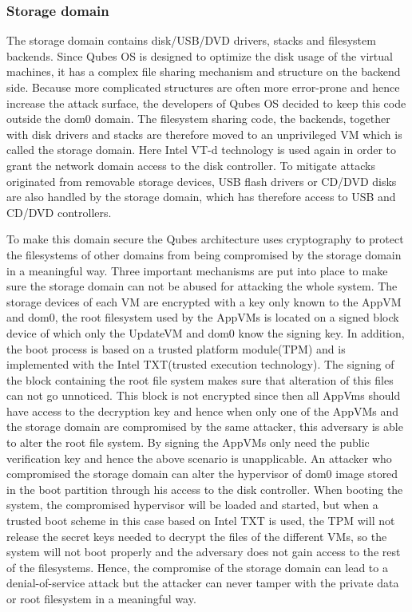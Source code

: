 \documentclass[runningheads,a4paper]{article}
\begin{document}
\subsubsection{Storage domain}

The storage domain contains disk/USB/DVD drivers, stacks and
filesystem backends. Since Qubes OS is designed to optimize the disk
usage of the virtual machines, it has a complex file sharing mechanism
and structure on the backend side. Because more complicated structures
are often more error-prone and hence increase the attack surface, the
developers of Qubes OS decided to keep this code outside the dom0
domain. The filesystem sharing code, the backends, together with disk
drivers and stacks are therefore moved to an unprivileged VM which is
called the storage domain. Here Intel VT-d technology is used again in 
order to grant the network domain access to the disk controller. To
mitigate attacks originated from removable storage devices, USB flash
drivers or CD/DVD disks are also handled by the storage domain, which
has therefore access to USB and CD/DVD controllers.

To make this domain secure the Qubes architecture uses cryptography to
protect the filesystems of other domains from being compromised by the
storage domain in a meaningful way. Three important mechanisms are put
into place to make sure the storage domain can not be abused for
attacking the whole system. The storage devices of each VM are
encrypted with a key only known to the AppVM and dom0, the root
filesystem used by the AppVMs is located on a signed block device of
which only the UpdateVM and dom0 know the signing key. In addition, the boot
process is based on a trusted platform module(TPM) and is implemented
with the Intel TXT(trusted execution technology). The signing of the
block containing the root file system makes sure that alteration of
this files can not go unnoticed. This block is not encrypted since
then all AppVms should have access to the decryption key and hence
when only one of the AppVMs and the storage domain are compromised by
the same attacker, this adversary is able to alter the root file
system. By signing the AppVMs only need the public verification key
and hence the above scenario is unapplicable. An attacker who
compromised the storage domain can alter the hypervisor of dom0 image
stored in the boot partition through his access to the disk
controller. When booting the system, the compromised hypervisor will be
loaded and started, but when a trusted boot scheme in this case based
on Intel TXT is used, the TPM will not release the secret keys needed
to decrypt the files of the different VMs, so the system will not boot
properly and the adversary does not gain access to the rest of the
filesystems. Hence, the compromise of the storage domain can lead to a
denial-of-service attack but the attacker can never tamper with the
private data or root filesystem in a meaningful way.
\end{document}
